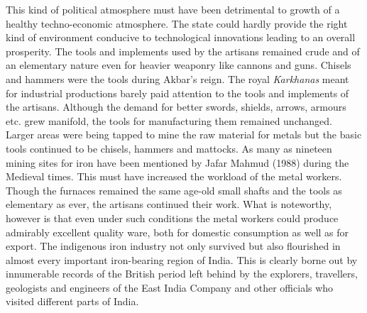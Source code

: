 This kind of political atmosphere must have been detrimental to growth of a healthy techno-economic atmosphere. The state could hardly provide the right kind of environment conducive to technological innovations leading to an overall prosperity. The tools and implements used by the artisans remained crude and of an elementary nature even for heavier weaponry like cannons and guns. Chisels and hammers were the tools during Akbar's reign. The royal \textit{Karkhanas} meant for industrial productions barely paid attention to the tools and implements of the artisans. Although the demand for better swords, shields, arrows, armours etc. grew manifold, the tools for manufacturing them remained unchanged. Larger areas were being tapped to mine the raw material for metals but the basic tools continued to be chisels, hammers and mattocks. As many as nineteen mining sites for iron have been mentioned by Jafar Mahmud (1988) during the Medieval times. This must have increased the workload of the metal workers. Though the furnaces remained the same age-old small shafts and the tools as elementary as ever, the artisans continued their work. What is noteworthy, however is that even under such conditions the metal workers could produce admirably excellent quality ware, both for domestic consumption as well as for export. The indigenous iron industry not only survived but also flourished in almost every important iron-bearing region of India. This is clearly borne out by innumerable records of the British period left behind by the explorers, travellers, geologists and engineers of the East India Company and other officials who visited different parts of India.

